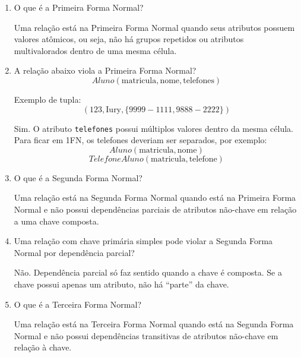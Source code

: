 \documentclass[12pt,a4paper]{article}
\begin{document}
\begin{enumerate}[resume,label=\textbf{Q\arabic*.}]

\item O que é a Primeira Forma Normal?

\begin{resposta}
Uma relação está na Primeira Forma Normal quando seus atributos possuem valores atômicos, ou seja, não há grupos repetidos ou atributos multivalorados dentro de uma mesma célula.
\end{resposta}

\item A relação abaixo viola a Primeira Forma Normal?
\[
Aluno(\text{matricula}, \text{nome}, \text{telefones})
\]

Exemplo de tupla:
\[
(123, \text{Iury}, \{9999-1111, 9888-2222\})
\]

\begin{resposta}
Sim. O atributo \texttt{telefones} possui múltiplos valores dentro da mesma célula. Para ficar em 1FN, os telefones deveriam ser separados, por exemplo:
\[
Aluno(\text{matricula}, \text{nome})
\]
\[
TelefoneAluno(\text{matricula}, \text{telefone})
\]
\end{resposta}

\item O que é a Segunda Forma Normal?

\begin{resposta}
Uma relação está na Segunda Forma Normal quando está na Primeira Forma Normal e não possui dependências parciais de atributos não-chave em relação a uma chave composta.
\end{resposta}

\item Uma relação com chave primária simples pode violar a Segunda Forma Normal por dependência parcial?

\begin{resposta}
Não. Dependência parcial só faz sentido quando a chave é composta. Se a chave possui apenas um atributo, não há ``parte'' da chave.
\end{resposta}

\item O que é a Terceira Forma Normal?

\begin{resposta}
Uma relação está na Terceira Forma Normal quando está na Segunda Forma Normal e não possui dependências transitivas de atributos não-chave em relação à chave.
\end{resposta}


\end{enumerate}
\end{document}
